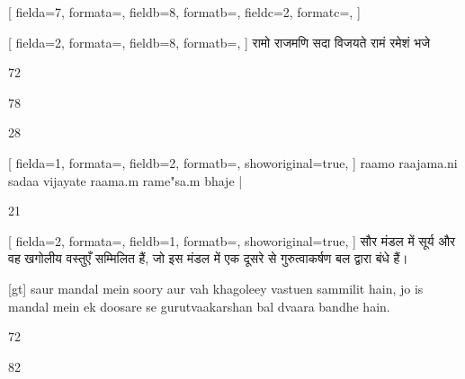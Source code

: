 \documentclass{article}
\begin{document}


\begin{multicols}{4}
[
fielda=7,
formata=\small,
fieldb=8,
formatb=\fipa,
fieldc=2,
formatc=\fdevb,
]
\end{multicols}







\newpage
{}[
fielda=2,
formata=\fdevb,
fieldb=8,
formatb=\fipa,
]{
रामो राजमणि सदा विजयते रामं रमेशं भजे
}

72 

78


28




[
fielda=1,
formata=\fipa,
fieldb=2,
formatb=\fdevb,
showoriginal=true,
]{
raamo raajama.ni sadaa vijayate raama.m rame"sa.m bhaje |
}

21

[
fielda=2,
formata=\fdevb,
fieldb=1,
formatb=\fipa,
showoriginal=true,
]{
सौर मंडल में सूर्य और वह खगोलीय वस्तुएँ सम्मिलित हैं, जो इस मंडल में एक दूसरे से गुरुत्वाकर्षण बल द्वारा बंधे हैं।
}

[gt] saur mandal mein soory aur vah khagoleey vastuen sammilit hain, jo is mandal mein ek doosare se gurutvaakarshan bal dvaara bandhe hain.


72 


82 

\end{document}
